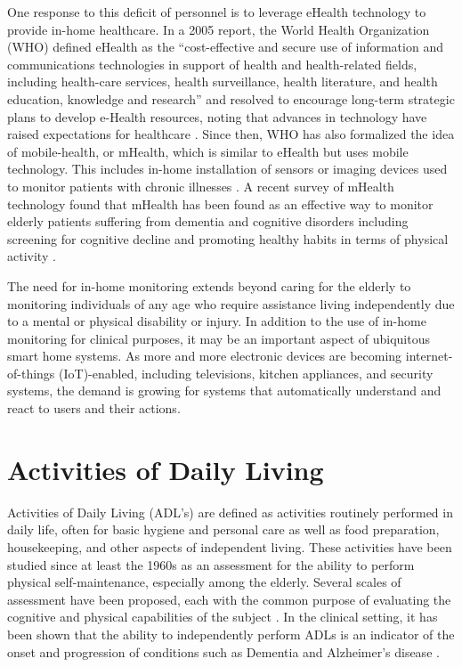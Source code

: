 \documentclass[12pt]{report}
\begin{document}
One response to this deficit of personnel is to leverage eHealth technology to provide in-home healthcare. In a 2005 report, the World Health Organization (WHO) defined eHealth as the “cost-effective and secure use of information and communications technologies in support of health and health-related fields, including health-care services, health surveillance, health literature, and health education, knowledge and research” and resolved to encourage long-term strategic plans to develop e-Health resources, noting that advances in technology have raised expectations for healthcare \cite{58thWorldHealthAssembly2005WHA58.28EHealth}. Since then, WHO has also formalized the idea of mobile-health, or mHealth, which is similar to eHealth but uses mobile technology. This includes in-home installation of sensors or imaging devices used to monitor patients with chronic illnesses \cite{WorldHealthOrganization2011MHealth:EHealth}. A recent survey of mHealth technology found that mHealth has been found as an effective way to monitor elderly patients suffering from dementia and cognitive disorders including screening for cognitive decline and promoting healthy habits in terms of physical activity \cite{Vazquez2018E-HealthReview}.

The need for in-home monitoring extends beyond caring for the elderly to monitoring individuals of any age who require assistance living independently due to a mental or physical disability or injury. In addition to the use of in-home monitoring for clinical purposes, it may be an important aspect of ubiquitous smart home systems. As more and more electronic devices are becoming internet-of-things (IoT)-enabled, including televisions, kitchen appliances, and security systems, the demand is growing for systems that automatically understand and react to users and their actions.


\section{Activities of Daily Living}
Activities of Daily Living (ADL’s) are defined as activities routinely performed in daily life, often for basic hygiene and personal care as well as food preparation, housekeeping, and other aspects of independent living. These activities have been studied since at least the 1960s \cite{LawtonAssessmentLiving} as an assessment for the ability to perform physical self-maintenance, especially among the elderly. Several scales of assessment have been proposed, each with the common purpose of evaluating the cognitive and physical capabilities of the subject \cite{LawtonAssessmentLiving, Bucks1996AssessmentScale, Carswell1993ActivitiesDisease}. In the clinical setting, it has been shown that the ability to independently perform ADLs is an indicator of the onset and progression of conditions such as Dementia and Alzheimer's disease \cite{Desai2004ActivitiesTreatment}.
\end{document}
